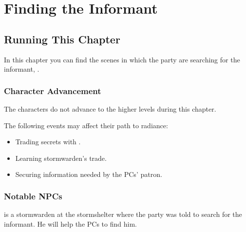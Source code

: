 \chapter{Finding the Informant}
\label{chap:chapterInformant}

\setcounter{section}{-1}
\section{Running This Chapter}

In this chapter you can find the scenes in which the party are searching for the informant, \npcInformant{}.

\subsection{Character Advancement}

The characters do not advance to the higher levels during this chapter.

The following events may affect their path to radiance:
\begin{itemize}
	\item Trading secrets with \npcStormwarden{}.
	\item Learning stormwarden's trade.
	\item Securing information needed by the PCs' patron.
\end{itemize}


\subsection{Notable NPCs}

\npcStormwarden[s]{} is a stormwarden at the stormshelter where the party was told to search for \npcInformant{} the informant. He will help the PCs to find him.



\newpage

\newpage

\newpage




